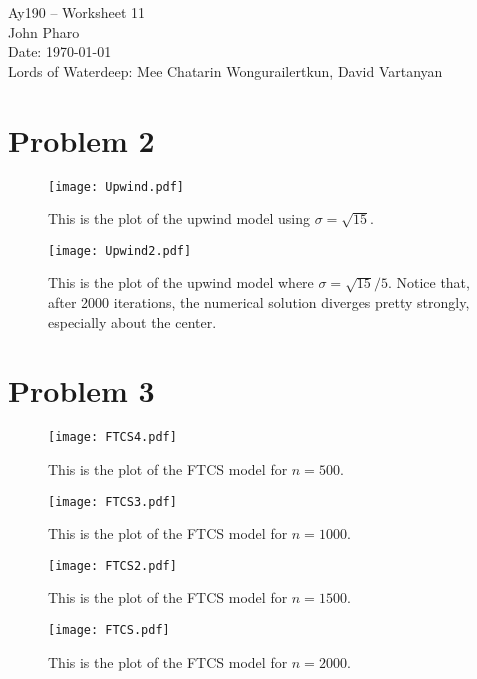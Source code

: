 \documentclass[11pt,letterpaper]{article}
\begin{document}
\begin{center}
\Large
Ay190 -- Worksheet 11\\
John Pharo\\
Date: \today\\
Lords of Waterdeep: Mee Chatarin Wongurailertkun, David Vartanyan
\end{center}

\section*{Problem 2}

\begin{figure}[bth]
\centering
\texttt{[image: Upwind.pdf]}
\caption{This is the plot of the upwind model using $\sigma = \sqrt{15}$.}
\label{fig:simpleplot}
\end{figure}

\begin{figure}[bth]
\centering
\texttt{[image: Upwind2.pdf]}
\caption{This is the plot of the upwind model where $\sigma = \sqrt{15}/5$. Notice that, after 2000 iterations, the numerical solution diverges pretty strongly, especially about the center.}
\label{fig:simpleplot}
\end{figure}

\section*{Problem 3}

\begin{figure}[bth]
\centering
\texttt{[image: FTCS4.pdf]}
\caption{This is the plot of the FTCS model for $n=500$.}
\label{fig:simpleplot}
\end{figure}

\begin{figure}[bth]
\centering
\texttt{[image: FTCS3.pdf]}
\caption{This is the plot of the FTCS model for $n=1000$.}
\label{fig:simpleplot}
\end{figure}

\begin{figure}[bth]
\centering
\texttt{[image: FTCS2.pdf]}
\caption{This is the plot of the FTCS model for $n=1500$.}
\label{fig:simpleplot}
\end{figure}

\begin{figure}[bth]
\centering
\texttt{[image: FTCS.pdf]}
\caption{This is the plot of the FTCS model for $n=2000$.}
\label{fig:simpleplot}
\end{figure}
\end{document}
